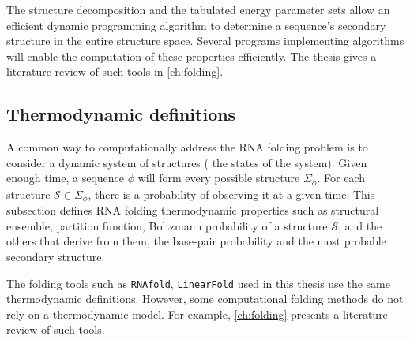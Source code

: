 The structure decomposition and the tabulated energy parameter sets allow an efficient dynamic programming algorithm to determine a sequence's secondary structure in the entire structure space. Several programs implementing algorithms will enable the computation of these properties efficiently. The thesis gives a literature review of such tools in \autoref{ch:folding}.
\subsection{Thermodynamic definitions}
\label{subsec:thermodynamic_definitions}
A common way to computationally address the \ac{RNA} folding problem is to consider a dynamic system of structures ( the states of the system). Given enough time, a sequence $\phi$ will form every possible structure $\Sigma_{\phi}$. For each structure $\mathcal{S} \in \Sigma_{\phi}$,  there is a probability of observing it at a given time. This subsection defines \ac{RNA} folding thermodynamic properties such as structural ensemble, partition function, Boltzmann probability of a structure $\mathcal{S}$, and the others that derive from them, the base-pair probability and the most probable secondary structure. 

The folding tools such as \texttt{RNAfold}, \texttt{LinearFold} used in this thesis use the same thermodynamic definitions. However, some computational folding methods do not rely on a thermodynamic model. For example,  \autoref{ch:folding} presents a literature review of such tools. 

